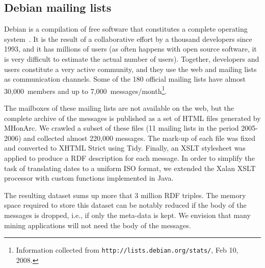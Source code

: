\documentclass{../templates/www2008-submission}
\begin{document}
\subsection{Debian mailing lists}\label{sec:debian}

Debian is a compilation of free software that constitutes a
complete operating system~\cite{Krafft2005}. It is the result of a
collaborative effort by a thousand developers since 1993, and it has
millions of users (as often happens with open source software, it is very
difficult to estimate the actual number of users). Together, developers
and users constitute a very active community, and they use the web and
mailing lists as communication channels. Some of the 180 official mailing
lists have almost 30,000~members and up to
7,000~messages/month\footnote{Information collected from \texttt{http://lists.debian.org/stats/}, Feb 10, 2008.}.

The mailboxes of these mailing lists are not available on the web, but
the complete archive of the messages is published as a set of
HTML files generated by MHonArc. We crawled a subset of these files
(11 mailing lists in the period 2005-2006) and collected almost 220,000
messages. The mark-up of each file was fixed and converted to XHTML Strict
using Tidy. Finally, an XSLT stylesheet was applied to produce a
RDF description for each message. In order to simplify the
task of translating dates to a uniform ISO format, we extended
the Xalan XSLT processor with custom functions implemented in Java.

The resulting dataset sums up more that 3 million RDF triples. The
memory space required to store this dataset can be notably
reduced if the body of the messages is dropped, i.e., if only the meta-data
is kept. We envision that many mining applications will not need the
body of the messages.

%
%
\end{document}
